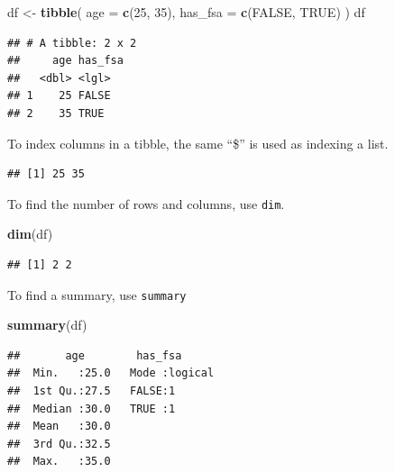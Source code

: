 \documentclass[openany]{book}
\newenvironment{Shaded}{\begin{snugshade}}{\end{snugshade}}
\newcommand{\DataTypeTok}[1]{\textcolor[rgb]{0.13,0.29,0.53}{#1}}
\newcommand{\DecValTok}[1]{\textcolor[rgb]{0.00,0.00,0.81}{#1}}
\newcommand{\KeywordTok}[1]{\textcolor[rgb]{0.13,0.29,0.53}{\textbf{#1}}}
\newcommand{\NormalTok}[1]{#1}
\newcommand{\OperatorTok}[1]{\textcolor[rgb]{0.81,0.36,0.00}{\textbf{#1}}}
\newcommand{\OtherTok}[1]{\textcolor[rgb]{0.56,0.35,0.01}{#1}}
\newcommand{\StringTok}[1]{\textcolor[rgb]{0.31,0.60,0.02}{#1}}
\begin{document}
\begin{Shaded}
\begin{Highlighting}[]
\NormalTok{df <-}\StringTok{ }\KeywordTok{tibble}\NormalTok{(}
  \DataTypeTok{age =} \KeywordTok{c}\NormalTok{(}\DecValTok{25}\NormalTok{, }\DecValTok{35}\NormalTok{), }\DataTypeTok{has_fsa =} \KeywordTok{c}\NormalTok{(}\OtherTok{FALSE}\NormalTok{, }\OtherTok{TRUE}\NormalTok{)}
\NormalTok{)}
\NormalTok{df}
\end{Highlighting}
\end{Shaded}

\begin{verbatim}
## # A tibble: 2 x 2
##     age has_fsa
##   <dbl> <lgl>  
## 1    25 FALSE  
## 2    35 TRUE
\end{verbatim}

To index columns in a tibble, the same ``\$'' is used as indexing a list.

\begin{Shaded}
\end{Shaded}

\begin{verbatim}
## [1] 25 35
\end{verbatim}

To find the number of rows and columns, use \texttt{dim}.

\begin{Shaded}
\begin{Highlighting}[]
\KeywordTok{dim}\NormalTok{(df)}
\end{Highlighting}
\end{Shaded}

\begin{verbatim}
## [1] 2 2
\end{verbatim}

To find a summary, use \texttt{summary}

\begin{Shaded}
\begin{Highlighting}[]
\KeywordTok{summary}\NormalTok{(df)}
\end{Highlighting}
\end{Shaded}

\begin{verbatim}
##       age        has_fsa       
##  Min.   :25.0   Mode :logical  
##  1st Qu.:27.5   FALSE:1        
##  Median :30.0   TRUE :1        
##  Mean   :30.0                  
##  3rd Qu.:32.5                  
##  Max.   :35.0
\end{verbatim}
\end{document}
